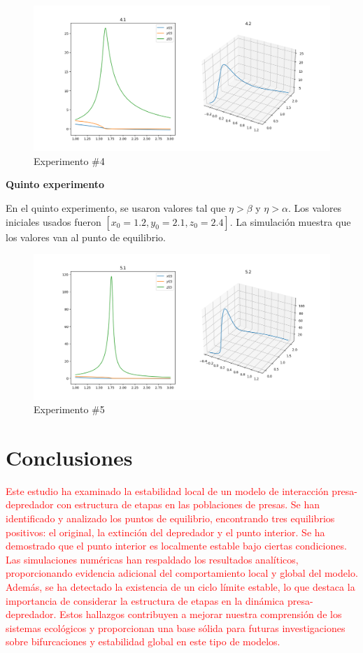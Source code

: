 \documentclass{wscpaperproc}
\theoremstyle{wsc}
\begin{document}
\begin{figure}[h!]
	\includegraphics[width=\linewidth]{./images/4.png}
	\caption{Experimento \#4}
\end{figure}

\vspace*{7cm}
{\bf Quinto experimento}

En el quinto experimento, se usaron valores tal que $\eta > \beta$ y $\eta > \alpha$.
Los valores iniciales usados fueron $[x_0=1.2, y_0=2.1, z_0=2.4]$. La simulación muestra
que los valores van al punto de equilibrio.

\begin{figure}[!h]
	\includegraphics[width=\linewidth]{./images/5.png}
	\caption{Experimento \#5}
\end{figure}
\vspace*{1cm}


\section*{Conclusiones}

\textcolor{red}{
	Este estudio ha examinado la estabilidad local de un modelo de interacción presa-depredador con estructura
	de etapas en las poblaciones de presas. Se han identificado y analizado los puntos de equilibrio,
	encontrando tres equilibrios positivos: el original, la extinción del depredador y el punto interior.
	Se ha demostrado que el punto interior es localmente estable bajo ciertas condiciones. Las simulaciones
	numéricas han respaldado los resultados analíticos, proporcionando evidencia adicional del comportamiento
	local y global del modelo. Además, se ha detectado la existencia de un ciclo límite estable, lo que destaca
	la importancia de considerar la estructura de etapas en la dinámica presa-depredador. Estos hallazgos
	contribuyen a mejorar nuestra comprensión de los sistemas ecológicos y proporcionan una base sólida para
	futuras investigaciones sobre bifurcaciones y estabilidad global en este tipo de modelos.
}
\end{document}
